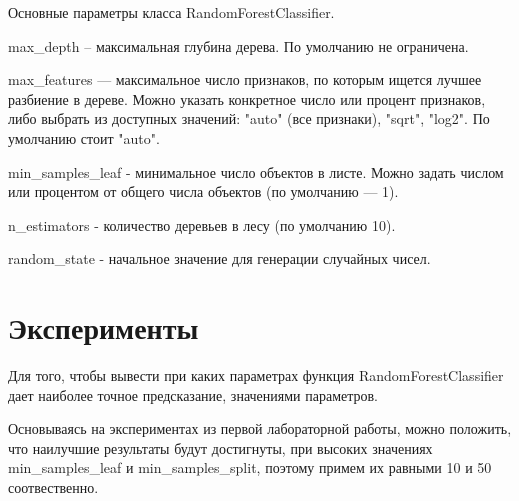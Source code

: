 \documentclass[a4paper,12pt]{article}
\begin{document}
	\vspace{0.5cm}
	Основные параметры класса RandomForestClassifier.
	
	\vspace{0.5cm}
	max\_depth – максимальная глубина дерева. По умолчанию не ограничена.
	
	\vspace{0.5cm}
	max\_features — максимальное число признаков, по которым ищется лучшее разбиение в дереве. Можно указать конкретное число или процент признаков, либо выбрать из доступных значений: "auto" (все признаки), "sqrt", "log2". По умолчанию стоит "auto".
	
	\vspace{0.5cm}
	min\_samples\_leaf - минимальное число объектов в листе. Можно задать числом или процентом от общего числа объектов (по умолчанию — 1).
	
	\vspace{0.5cm}
	n\_estimators - количество деревьев в лесу (по умолчанию 10).
	
	\vspace{0.5cm}
	random\_state - начальное значение для генерации случайных чисел.

	
\newpage\section{Эксперименты}
	Для того, чтобы вывести при каких параметрах функция RandomForestClassifier дает наиболее точное предсказание, 	значениями параметров. 
	
	\vspace{0.5cm}
	Основываясь на экспериментах из первой лабораторной работы, можно положить, что наилучшие результаты будут достигнуты, при высоких значениях min\_samples\_leaf и min\_samples\_split, поэтому примем их равными 10 и 50 соотвественно.
\end{document}
